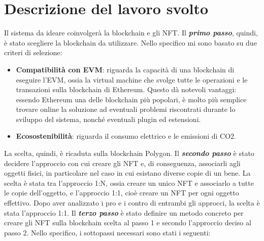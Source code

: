 \documentclass[a4paper, 12pt, italian]{extarticle}
\begin{document}
\section{Descrizione del lavoro svolto}
Il sistema da ideare coinvolgerà la blockchain e gli NFT.\newline
Il \textbf{\textit{primo passo}}, quindi, è stato scegliere la blockchain da utilizzare. Nello specifico mi sono basato su due criteri di selezione:
\begin{itemize}[topsep=5pt, itemsep=0pt]
    \item \textbf{Compatibilità con EVM}: riguarda la capacità di una blockchain di eseguire l’EVM, ossia la virtual machine che svolge tutte le operazioni e le transazioni sulla blockchain di Ethereum. Questo dà notevoli vantaggi: essendo Ethereum una delle blockchain più popolari, è molto più semplice trovare online la soluzione ad eventuali problemi riscontrati durante lo sviluppo del sistema, nonché eventuali plugin ed estensioni.
    \item \textbf{Ecosostenibilità}: riguarda il consumo elettrico e le emissioni di CO2.
\end{itemize}
La scelta, quindi, è ricaduta sulla blockchain Polygon.\newline\newline
Il \textbf{\textit{secondo passo}} è stato decidere l'approccio con cui creare gli NFT e, di conseguenza, associarli agli oggetti fisici, in particolare nel caso in cui esistano diverse copie di un bene. La scelta è stata tra l'approccio 1:N, ossia creare un unico NFT e associarlo a tutte le copie dell’oggetto, e l'approccio 1:1, cioè creare un NFT per ogni oggetto effettivo. Dopo aver analizzato i pro e i contro di entrambi gli approcci, la scelta è stata l'approccio 1:1.\newline\newline
Il \textbf{\textit{terzo passo}} è stato definire un metodo concreto per creare gli NFT sulla blockchain scelta al passo 1 e secondo l'approccio deciso al passo 2. Nello specifico, i sottopassi necessari sono stati i seguenti:
\end{document}
